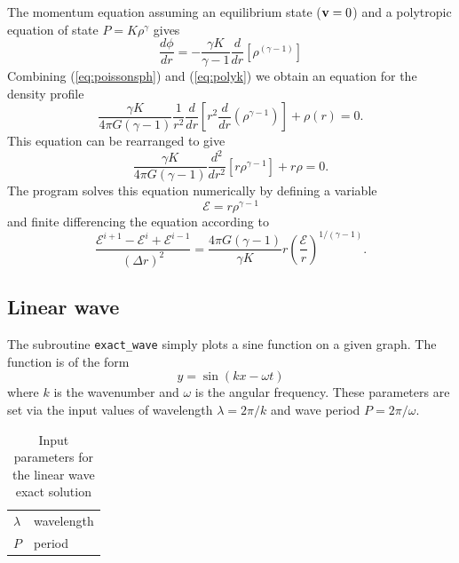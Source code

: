 \documentclass[a4paper,10pt]{article}
\begin{document}
  The momentum equation assuming an equilibrium state (${\bf v} = 0$) and a
polytropic equation of state $P = K\rho^{\gamma}$ gives
\begin{equation}
\frac{d\phi}{dr} = - \frac{\gamma K}{\gamma-1}\frac{d}{dr} \left[\rho^{(\gamma -1)} \right]
\label{eq:polyk}
\end{equation}
Combining (\ref{eq:poissonsph}) and (\ref{eq:polyk}) we obtain an equation for the density profile
\begin{equation}
\frac{\gamma K}{4\pi G (\gamma - 1)} \frac{1}{r^{2}} \frac{d}{dr} \left[r^{2}
\frac{d}{dr}\left( \rho^{\gamma-1} \right) \right] + \rho(r) = 0.
\label{eq:dens}
\end{equation}
This equation can be rearranged to give
\begin{equation}
\frac{\gamma K}{4\pi G (\gamma - 1)} \frac{d^2}{dr^2}
\left[r\rho^{\gamma-1}\right] + r\rho = 0.
\end{equation}
 The program solves this equation numerically by defining a variable
\begin{equation}
\mathcal{E} = r \rho^{\gamma-1}
\end{equation}
and finite differencing the equation according to
\begin{equation}
\frac{\mathcal{E}^{i+1} - \mathcal{E}^i + \mathcal{E}^{i-1}}{(\Delta r)^2} =
\frac{4\pi G (\gamma - 1)}{\gamma K} r
\left(\frac{\mathcal{E}}{r}\right)^{1/(\gamma-1)}.
\end{equation}

\subsection{Linear wave}
 The subroutine \verb+exact_wave+ simply plots a sine function on a given graph.
 The function is of the form
\begin{equation}
y = \sin{(k x - \omega t)}
\end{equation}
where $k$ is the wavenumber and $\omega$ is the angular frequency. These
parameters are set via the input values of wavelength $\lambda = 2\pi/k$ and
wave period $P = 2\pi/\omega$.

\begin{table}
\centering
\begin{tabular}{|l|l|}
\hline
$\lambda$ & wavelength \\
$P$ & period \\
\hline
\end{tabular}
\caption{Input parameters for the linear wave exact solution}
\end{table}
\end{document}
